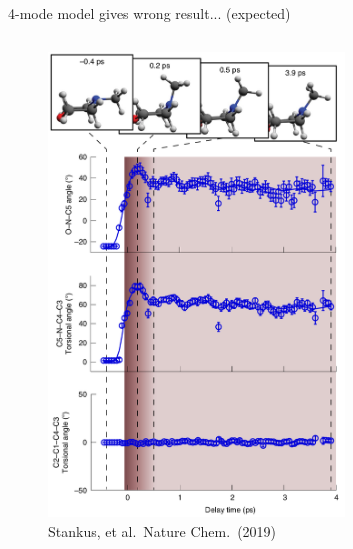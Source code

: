 \documentclass{beamer}
\begin{document}
\begin{frame}{4-mode model gives wrong result... (expected)}
\begin{columns}
\begin{column}{0.5\textwidth}
\begin{figure}[H]
	\centering
	\includegraphics[width=0.7\textwidth]{stankus_angle_plots.png}
	\caption{{\tiny Stankus, et al.\ Nature Chem.\ (2019)}}
	\label{fig:nmm-geom}
\end{figure}
\end{column}
\end{columns}
\end{frame}
\end{document}
